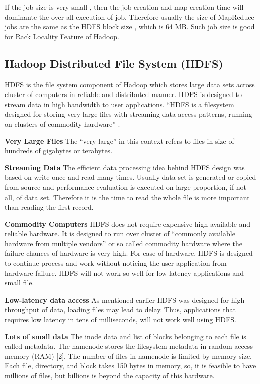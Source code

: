 If the job size is very small , then the job creation and map creation time will dominante the over all execution of job. Therefore usually the size of MapReduce jobs are the same as the HDFS block size , which is 64 MB. Such job size is good for Rack Locality Feature of Hadoop.


\subsection{Hadoop Distributed File System (HDFS)}

HDFS is the file system component of Hadoop which stores large data sets across cluster of computers in reliable and distributed manner. HDFS is designed to stream data in high bandwidth to user applications.
“HDFS is a filesystem designed for storing very large files with streaming data access patterns, running on clusters of commodity hardware” \cite{tom3} \cite{sailfish}.

\textbf{Very Large Files} 
  The “very large” in this context refers to files in size of hundreds of gigabytes or terabytes.

\textbf{Streaming Data}
  The efficient data processing idea behind HDFS design was based on write-once and read many times. Usually data set is generated or copied from source and performance evaluation is executed on large proportion, if not all, of data set. Therefore it is the time to read the whole file is more important than reading the first record\cite{tom3}. 
  
\textbf{Commodity Computers}
   HDFS does not require expensive high-available and reliable hardware. It is designed to run over cluster of  “commonly available hardware from multiple vendors” or so called commodity hardware where the  failure chances of hardware is very high. For case of hardware, HDFS is designed to continue process and work without noticing the user application from hardware failure. HDFS will not work so well for low latency applications and small file.\cite{tom3} 

\textbf{Low-latency data access}
As mentioned earlier HDFS was designed for high throughput of data, loading files may lead to delay. Thus, applications that requires low latency in tens of milliseconds, will not work well using HDFS.\cite{tom3} 

\textbf{Lots of small data}
The inode data and list of blocks belonging to each file is called metadata. The namenode stores the filesystem metadata in random access memory (RAM) [2]. The number of files in namenode is limited by memory size. Each file, directory, and block takes 150 bytes in memory, so, it is feasible to have millions of files, but billions is beyond the capacity of this hardware.\cite{tom3}
   
